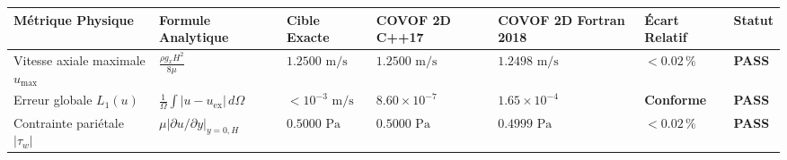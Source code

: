 \documentclass[
  10pt,
]{article}
\newcounter{none} %
\begin{document}
{\def\LTcaptype{none} %
\begin{longtable}[]{@{}
  >{\raggedright\arraybackslash}p{}
  >{\centering\arraybackslash}p{}
  >{\centering\arraybackslash}p{}
  >{\centering\arraybackslash}p{}
  >{\centering\arraybackslash}p{}
  >{\centering\arraybackslash}p{}
  >{\centering\arraybackslash}p{}@{}}
\toprule\noalign{}
\begin{minipage}[b]{\linewidth}\raggedright
Métrique Physique
\end{minipage} & \begin{minipage}[b]{\linewidth}\centering
Formule Analytique
\end{minipage} & \begin{minipage}[b]{\linewidth}\centering
Cible Exacte
\end{minipage} & \begin{minipage}[b]{\linewidth}\centering
COVOF 2D C++17
\end{minipage} & \begin{minipage}[b]{\linewidth}\centering
COVOF 2D Fortran 2018
\end{minipage} & \begin{minipage}[b]{\linewidth}\centering
Écart Relatif
\end{minipage} & \begin{minipage}[b]{\linewidth}\centering
Statut
\end{minipage} \\
\midrule\noalign{}
\endhead
\bottomrule\noalign{}
\endlastfoot
Vitesse axiale maximale \(u_{\max}\) & \(\frac{\rho g_x H^2}{8\mu}\) &
\(1.2500\text{ m/s}\) & \textbf{\(1.2500\text{ m/s}\)} &
\textbf{\(1.2498\text{ m/s}\)} & \textbf{\(< 0.02\,\%\)} &
\textbf{PASS} \\
Erreur globale \(L_1(u)\) &
\(\frac{1}{\Omega}\int |u - u_{\text{ex}}|\,d\Omega\) &
\(< 10^{-3}\text{ m/s}\) & \textbf{\(8.60 \times 10^{-7}\)} &
\textbf{\(1.65 \times 10^{-4}\)} & \textbf{Conforme} & \textbf{PASS} \\
Contrainte pariétale \(|\tau_w|\) &
\(\mu |\partial u/\partial y|_{y=0,H}\) & \(0.5000\text{ Pa}\) &
\textbf{\(0.5000\text{ Pa}\)} & \textbf{\(0.4999\text{ Pa}\)} &
\textbf{\(< 0.02\,\%\)} & \textbf{PASS} \\
\end{longtable}
}
\end{document}
